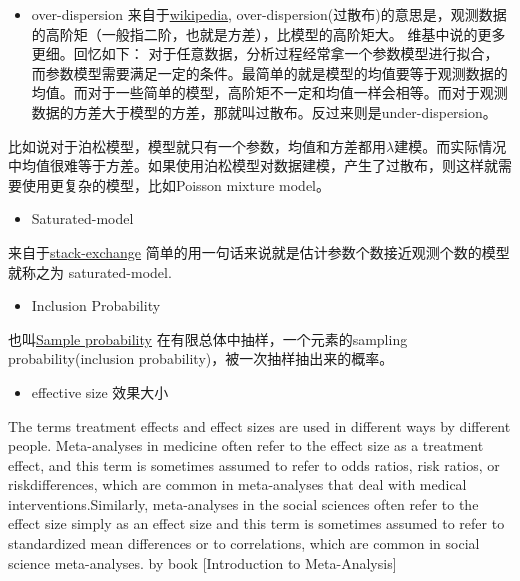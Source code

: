 \documentclass[
]{book}
\providecommand{\tightlist}{%
  \setlength{\itemsep}{0pt}\setlength{\parskip}{0pt}}
\theoremstyle{definition}
\theoremstyle{definition}
\theoremstyle{definition}
\theoremstyle{remark}
\begin{document}
\begin{itemize}
\tightlist
\item
  over-dispersion
  来自于\href{https://en.wikipedia.org/wiki/Overdispersion}{wikipedia}, over-dispersion(过散布)的意思是，观测数据的高阶矩（一般指二阶，也就是方差），比模型的高阶矩大。
  维基中说的更多更细。回忆如下：
  对于任意数据，分析过程经常拿一个参数模型进行拟合，而参数模型需要满足一定的条件。最简单的就是模型的均值要等于观测数据的均值。而对于一些简单的模型，高阶矩不一定和均值一样会相等。而对于观测数据的方差大于模型的方差，那就叫过散布。反过来则是under-dispersion。
\end{itemize}

比如说对于泊松模型，模型就只有一个参数，均值和方差都用\(\lambda\)建模。而实际情况中均值很难等于方差。如果使用泊松模型对数据建模，产生了过散布，则这样就需要使用更复杂的模型，比如Poisson mixture model。

\begin{itemize}
\tightlist
\item
  Saturated-model
\end{itemize}

来自于\href{https://stats.stackexchange.com/questions/283/what-is-a-saturated-model}{stack-exchange}
简单的用一句话来说就是估计参数个数接近观测个数的模型就称之为 saturated-model.

\begin{itemize}
\tightlist
\item
  Inclusion Probability
\end{itemize}

也叫\href{https://en.wikipedia.org/wiki/Sampling_probability}{Sample probability}
在有限总体中抽样，一个元素的sampling probability(inclusion probability)，被一次抽样抽出来的概率。

\begin{itemize}
\tightlist
\item
  effective size 效果大小
\end{itemize}

The terms treatment effects and effect sizes are used in different ways by different people. Meta-analyses in medicine often refer to the effect size as a treatment effect, and this term is sometimes assumed to refer to odds ratios, risk ratios, or riskdifferences, which are common in meta-analyses that deal with medical interventions.Similarly, meta-analyses in the social sciences often refer to the effect size simply as an effect size and this term is sometimes assumed to refer to standardized mean differences or to correlations, which are common in social science meta-analyses. by book {[}Introduction to Meta-Analysis{]}
\end{document}
